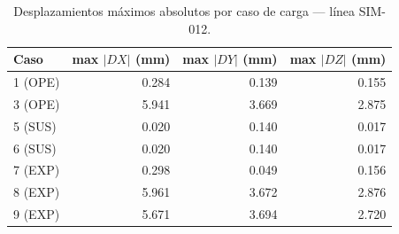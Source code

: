 \begin{table}[htbp]
  \centering
  \small
  \caption{Desplazamientos máximos absolutos por caso de carga — línea SIM-012.}
  \label{tab:desplaz-max}
  \begin{tabular}{lrrr}
    \toprule
    Caso & max $|DX|$ (\si{mm}) & max $|DY|$ (\si{mm}) & max $|DZ|$ (\si{mm}) \\
    \midrule
    1 (OPE) & 0.284 & 0.139 & 0.155 \\
    3 (OPE) & 5.941 & 3.669 & 2.875 \\
    5 (SUS) & 0.020 & 0.140 & 0.017 \\
    6 (SUS) & 0.020 & 0.140 & 0.017 \\
    7 (EXP) & 0.298 & 0.049 & 0.156 \\
    8 (EXP) & 5.961 & 3.672 & 2.876 \\
    9 (EXP) & 5.671 & 3.694 & 2.720 \\
    \bottomrule
  \end{tabular}
\end{table}
